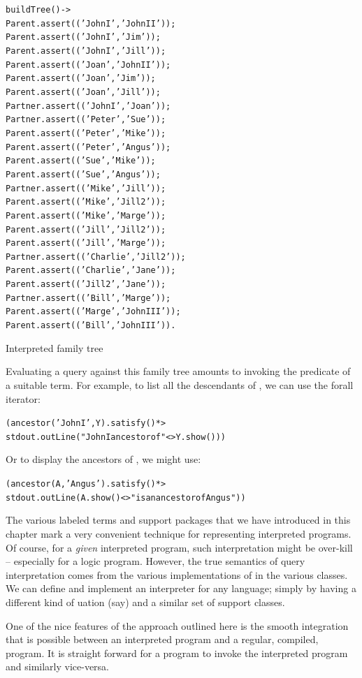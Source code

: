 \begin{program}
\vspace{0.5ex}
\begin{alltt}
buildTree() ->
    Parent.assert(('John I','John II'));
    Parent.assert(('John I','Jim'));
    Parent.assert(('John I','Jill'));
    Parent.assert(('Joan','John II'));
    Parent.assert(('Joan','Jim'));
    Parent.assert(('Joan','Jill'));
    Partner.assert(('John I','Joan'));
    Partner.assert(('Peter','Sue'));
    Parent.assert(('Peter','Mike'));
    Parent.assert(('Peter','Angus'));
    Parent.assert(('Sue','Mike'));
    Parent.assert(('Sue','Angus'));
    Partner.assert(('Mike','Jill'));
    Parent.assert(('Mike','Jill 2'));
    Parent.assert(('Mike','Marge'));
    Parent.assert(('Jill','Jill 2'));
    Parent.assert(('Jill','Marge'));
    Partner.assert(('Charlie','Jill 2'));
    Parent.assert(('Charlie','Jane'));
    Parent.assert(('Jill 2','Jane'));
    Partner.assert(('Bill','Marge'));
    Parent.assert(('Marge','John III'));
    Parent.assert(('Bill','John III')).
\end{alltt}
\vspace{-2ex}
\caption{Interpreted family tree}
\label{meta:family:setup}
\end{program}

Evaluating a query against this family tree amounts to invoking the  predicate of a suitable term. For example, to list all the descendants of , we can use the forall iterator:
\begin{alltt}
(ancestor('John I',Y).satisfy() *>
  stdout.outLine("John I ancestor of "<>Y.show()))
\end{alltt}
Or to display the ancestors of , we might use:
\begin{alltt}
(ancestor(A,'Angus').satisfy() *>
  stdout.outLine(A.show()<>"is an ancestor of Angus"))
\end{alltt}

The various labeled terms and support packages that we have introduced in this chapter mark a very convenient technique for representing interpreted programs. Of course, for a \emph{given} interpreted program, such interpretation might be over-kill -- especially for a logic program. However, the true semantics of query interpretation comes from the various implementations of  in the various classes. We can define and implement an interpreter for any language; simply by having a different kind of uation (say) and a similar set of support classes.

One of the nice features of the approach outlined here is the smooth integration that is possible between an interpreted program and a regular, compiled, \go program. It is straight forward for a \go program to invoke the interpreted program and similarly vice-versa.

